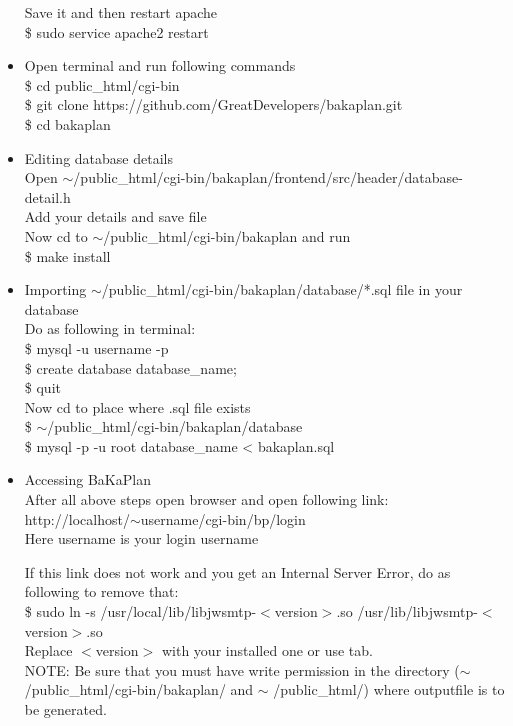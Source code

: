 \begin{itemize}
Save it and then restart apache \\
\tab \$ sudo service apache2 restart\\


\item Open terminal and run following commands\\
\tab \$ cd public\_html/cgi-bin\\
\tab \$ git clone https://github.com/GreatDevelopers/bakaplan.git\\
\tab \$ cd bakaplan\\

\item Editing database details\\
\tab Open $\sim$/public\_html/cgi-bin/bakaplan/frontend/src/header/database-detail.h\\
\tab Add your details and save file\\
\tab Now cd to $\sim$/public\_html/cgi-bin/bakaplan and run\\ 
\tab \$ make install\\

\item Importing $\sim$/public\_html/cgi-bin/bakaplan/database/*.sql file in your
database\\
\tab Do as following in terminal:\\
\tab \$ mysql -u username -p\\
\tab \$ create database database\_name;\\
\tab \$ quit\\

\tab Now cd to place where .sql file exists\\
\tab \$ $\sim$/public\_html/cgi-bin/bakaplan/database\\
\tab \$ mysql -p -u root database\_name < bakaplan.sql\\

\item Accessing BaKaPlan\\
\tab After all above steps open browser and open following link:\\
\tab http://localhost/$\sim$username/cgi-bin/bp/login\\

\tab Here username is your login username

\tab If this link does not work and you get an Internal Server Error, 
do as following to remove \tab that:\\
\tab \$ sudo ln -s /usr/local/lib/libjwsmtp-$<$version$>$.so /usr/lib/libjwsmtp-$<$version$>$.so\\
\tab Replace $<$version$>$ with your installed one or use tab.\\

NOTE:    Be sure that you must have write permission in the directory
         ($\sim$/public\_html/cgi-bin/bakaplan/ and $\sim$ /public\_html/)
         where outputfile is to be generated.\\

\end{itemize}
